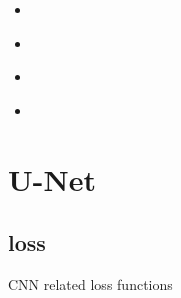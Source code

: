 \documentclass[letterpaper,10pt,english]{sphinxmanual}
\begin{document}
\begin{fulllineitems}
\begin{itemize}
\item {} 
{\hyperref[\detokenize{index:unet.loss.multi_loss_fun}]{}}

\item {} 
{\hyperref[\detokenize{index:util.load_data.load_train_data}]{}}

\item {} 
{\hyperref[\detokenize{index:util.load_batch.load_batch_parallel}]{}}

\item {} 

\end{itemize}



\end{fulllineitems}



\chapter{U-Net}
\label{\detokenize{index:u-net}}

\section{loss}
\label{\detokenize{index:module-unet.loss}}\label{\detokenize{index:loss}}
CNN related loss functions
\end{document}
